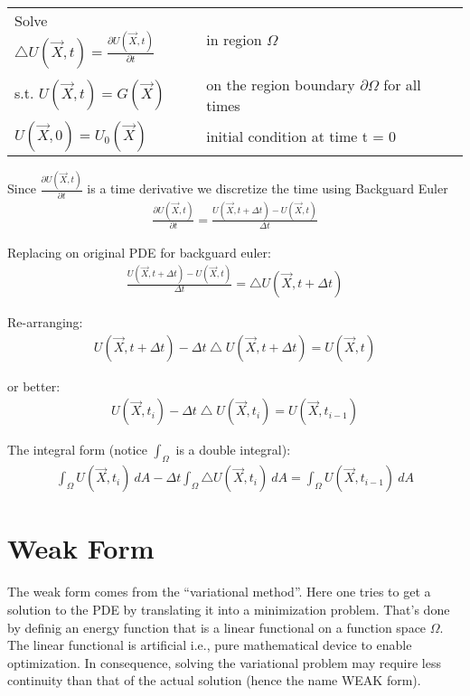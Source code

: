 \documentclass{birkjour}
\numberwithin{equation}{section}
\begin{document}
\begin{tabular}{l l}
	Solve $\bigtriangleup U(\vec X, t) = \frac{ \partial U(\vec X, t)}{\partial t}$ & in region $\Omega$ \\
	s.t. $U(\vec X, t) = G(\vec X)$  &  on the region boundary $\partial \Omega$ for all times \\
	$U(\vec X, 0) = U_0(\vec X)$  &  initial condition at time t = 0 \\
\end{tabular}


Since $\frac{ \partial U(\vec X, t)}{\partial t}$ is a time derivative we discretize the time using Backguard Euler
\begin{eqnarray}
	\frac{ \partial U(\vec X, t)}{\partial t} = \frac{U(\vec X, t + \Delta t) - U(\vec X, t)}{\Delta t}
\end{eqnarray}

Replacing on original PDE for backguard euler:
\begin{eqnarray}
	\frac{U(\vec X, t + \Delta t) - U(\vec X, t)}{\Delta t} = \bigtriangleup U(\vec X, t + \Delta t)
\end{eqnarray}

Re-arranging:
\begin{eqnarray}
 	U(\vec X, t + \Delta t) - \Delta t  \bigtriangleup U(\vec X, t + \Delta t) = U(\vec X, t)
\end{eqnarray}

or better:
\begin{eqnarray} 
	U(\vec X, t_i) - \Delta t \bigtriangleup U(\vec X, t_i) = U(\vec X, t_{i-1})
\end{eqnarray}

The integral form (notice $\int_{\Omega}$ is a double integral):
\begin{eqnarray} 
	\int_{\Omega}{ U(\vec X, t_i) \ dA} - \Delta t \int_{\Omega}{ \bigtriangleup U(\vec X, t_i) \ dA } = \int_{\Omega} { U(\vec X, t_{i-1}) \ dA }
\end{eqnarray}

\section{Weak Form}

The weak form comes from the ``variational method''. Here one tries to get a solution to the 
PDE by translating it into a minimization problem. That's done by definig an energy function that is a 
linear functional on a function space $\Omega$. The linear functional is artificial i.e., pure 
mathematical device to enable optimization. In consequence, solving the variational problem may 
require less continuity than that of the actual solution (hence the name WEAK form).
 
\end{document}
